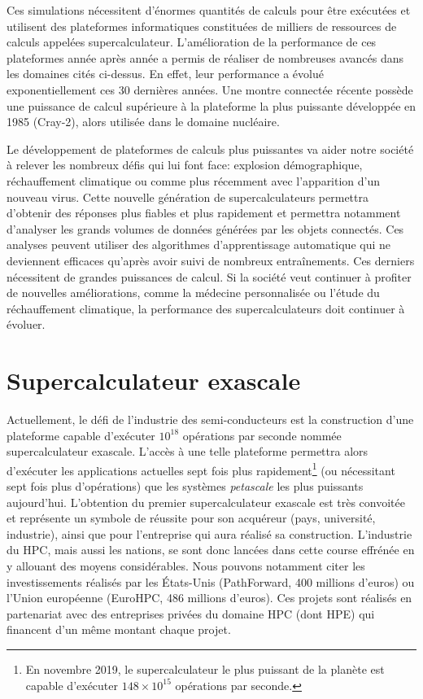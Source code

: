 Ces simulations nécessitent d'énormes quantités de calculs pour être exécutées et utilisent des plateformes informatiques constituées de milliers de ressources de calculs appelées supercalculateur. L'amélioration de la performance de ces plateformes année après année a permis de réaliser de nombreuses avancés dans les domaines cités ci-dessus. En effet, leur performance a évolué exponentiellement ces 30 dernières années. Une montre connectée récente possède une puissance de calcul supérieure à la plateforme la plus puissante développée en 1985 (Cray-2), alors utilisée dans le domaine nucléaire. 




Le développement de plateformes de calculs plus puissantes va aider notre société à relever les nombreux défis qui lui font face: explosion démographique, réchauffement climatique ou comme plus récemment avec l'apparition d'un nouveau virus. Cette nouvelle génération de supercalculateurs permettra d'obtenir des réponses plus fiables et plus rapidement et permettra notamment d'analyser les grands volumes de données générées par les objets connectés. Ces analyses peuvent utiliser des algorithmes d'apprentissage automatique qui ne deviennent efficaces qu'après avoir suivi de nombreux entraînements. Ces derniers nécessitent de grandes puissances de calcul. Si la société veut continuer à profiter de nouvelles améliorations, comme la médecine personnalisée ou l'étude du réchauffement climatique, la performance des supercalculateurs doit continuer à évoluer.


\section{Supercalculateur exascale}

Actuellement, le défi de l'industrie des semi-conducteurs est la construction d'une plateforme capable d'exécuter $10^{18}$ opérations par seconde nommée supercalculateur \gls{exascale}. L'accès à une telle plateforme permettra alors d'exécuter les applications actuelles sept fois plus rapidement\footnote{En novembre 2019, le supercalculateur le plus puissant de la planète est capable d'exécuter $148 \times 10^{15}$ opérations par seconde.} (ou nécessitant sept fois plus d'opérations) que les systèmes \textit{petascale} les plus puissants aujourd'hui. L'obtention du premier supercalculateur exascale est très convoitée et représente un symbole de réussite pour son acquéreur (pays, université, industrie), ainsi que pour l'entreprise qui aura réalisé sa construction. L'industrie du \gls{HPC}, mais aussi les nations, se sont donc lancées dans cette course effrénée en y allouant des moyens considérables. Nous pouvons notamment citer les investissements réalisés par les États-Unis (PathForward, 400 millions d'euros) ou l'Union européenne  (EuroHPC, 486 millions d'euros). Ces projets sont réalisés en partenariat avec des entreprises privées du domaine HPC (dont HPE) qui financent d'un même montant chaque projet.


